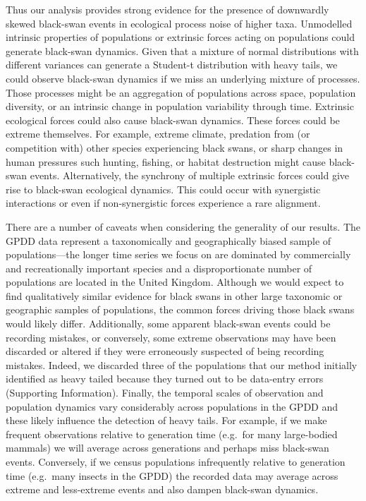 Thus our analysis provides strong evidence for the presence of downwardly skewed black-swan events in ecological process noise of higher taxa. Unmodelled intrinsic properties of populations or extrinsic forces acting on populations could generate black-swan dynamics. Given that a mixture of normal distributions with different variances can generate a Student-t distribution with heavy tails\cite{allen2001}, we could observe black-swan dynamics if we miss an underlying mixture of processes. Those processes might be an aggregation of populations across space, population diversity\cite{anderson2015}, or an intrinsic change in population variability through time. Extrinsic ecological forces could also cause black-swan dynamics\cite{nunez2012}. These forces could be extreme themselves. For example, extreme climate, predation from (or competition with) other species experiencing black swans, or sharp changes in human pressures such hunting, fishing, or habitat destruction might cause black-swan events. Alternatively, the synchrony of multiple extrinsic forces could give rise to black-swan ecological dynamics. This could occur with synergistic interactions\cite{kirby2009} or even if non-synergistic forces experience a rare alignment\cite{denny2009}.

There are a number of caveats when considering the generality of our results. The GPDD data represent a taxonomically and geographically biased sample of populations---the longer time series we focus on are dominated by commercially and recreationally important species and a disproportionate number of populations are located in the United Kingdom. Although we would expect to find qualitatively similar evidence for black swans in other large taxonomic or geographic samples of populations, the common forces driving those black swans would likely differ. Additionally, some apparent black-swan events could be recording mistakes, or conversely, some extreme observations may have been discarded or altered if they were erroneously suspected of being recording mistakes. Indeed, we discarded three of the populations that our method initially identified as heavy tailed because they turned out to be data-entry errors (Supporting Information). Finally, the temporal scales of observation and population dynamics vary considerably across populations in the GPDD and these likely influence the detection of heavy tails. For example, if we make frequent observations relative to generation time (e.g.~for many large-bodied mammals) we will average across generations and perhaps miss black-swan events. Conversely, if we census populations infrequently relative to generation time (e.g.~many insects in the GPDD) the recorded data may average across extreme and less-extreme events and also dampen black-swan dynamics.

